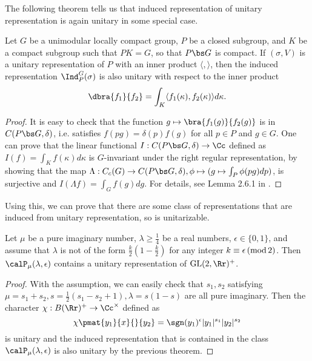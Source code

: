 The following theorem tells us that induced representation of unitary representation is again unitary in some special case. 
\begin{theorem}
Let $G$ be a unimodular locally compact group, $P$ be a closed subgroup, and $K$ be a compact subgroup such that $PK = G$, so that $P\bs G$ is compact. If $(\sigma, V)$ is a unitary representation of $P$ with an inner product $\langle, \rangle$, then the induced representation $\Ind_{P}^{G}(\sigma)$ is also unitary with respect to the inner product 
$$
\dbra{f_{1}}{f_{2}} = \int_{K} \langle f_{1}(\kappa), f_{2}(\kappa)\rangle d\kappa. 
$$ 
\end{theorem}
\begin{proof}
It is easy to check that the function $g\mapsto \bra{f_{1}(g)}{f_{2}(g)}$ is in $C(P\bs G, \delta)$, i.e. satisfies $f(pg) =\delta(p)f(g)$ for all $p\in P$ and $g\in G$. 
One can prove that the linear functional $I:C(P\bs G, \delta)\to \Cc$ defined as $I(f) = \int_{K} f(\kappa)d\kappa$ is $G$-invariant under the right regular representation, by showing that the map $\Lambda:C_{c}(G)\to C(P\bs G, \delta), \phi\mapsto (g\mapsto \int_{P} \phi(pg)dp)$, is surjective and $I(\Lambda f) = \int_{G}f(g)dg$. 
For details, see Lemma 2.6.1 in \cite{bu}. 
\end{proof}
Using this, we can prove that there are some class of representations that are induced from unitary representation, so is unitarizable. 
\begin{theorem}
Let $\mu$ be a pure imaginary number, $\lambda\geq \frac{1}{4}$  be a real numbers, $\epsilon\in \{0, 1\}$, and assume that $\lambda$ is not of the form $\frac{k}{2}\left(1-\frac{k}{2}\right)$ for any integer $k\equiv \epsilon\,(\mathrm{mod}\,2)$. Then $\calP_{\mu}(\lambda, \epsilon)$ contains a unitary representation of $\GL(2, \Rr)^{+}$. 
\end{theorem}
\begin{proof}
With the assumption, we can easily check that $s_{1}, s_{2}$ satisfying $\mu = s_{1} + s_{2}, s = \frac{1}{2}(s_{1}-  s_{2} + 1), \lambda = s(1-s)$ are all pure imaginary. Then the character $\chi:B(\Rr)^{+}\to \Cc^{\times}$ defined as
$$
\chi\pmat{y_{1}}{x}{}{y_{2}} = \sgn(y_{1})^{\epsilon}|y_{1}|^{s_{1}}|y_{2}|^{s_{2}}
$$
is unitary and the induced representation that is contained in the class $\calP_{\mu}(\lambda, \epsilon)$ is also unitary by the previous theorem. 
\end{proof}

